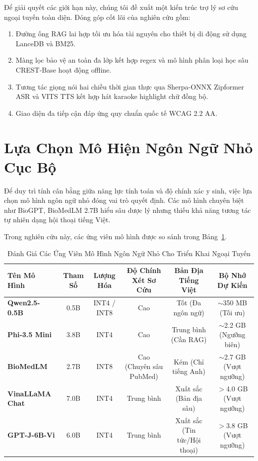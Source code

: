 \documentclass[journal]{IEEEtran}
\begin{document}
Để giải quyết các giới hạn này, chúng tôi đề xuất một kiến trúc trợ lý sơ cứu ngoại tuyến toàn diện. Đóng góp cốt lõi của nghiên cứu gồm:
\begin{enumerate}
\item Đường ống RAG lai hợp tối ưu hóa tài nguyên cho thiết bị di động sử dụng LanceDB và BM25.
\item Màng lọc bảo vệ an toàn đa lớp kết hợp regex và mô hình phân loại học sâu CREST-Base hoạt động offline.
\item Tương tác giọng nói hai chiều thời gian thực qua Sherpa-ONNX Zipformer ASR và VITS TTS kết hợp hát karaoke highlight chữ đồng bộ.
\item Giao diện đa tiếp cận đáp ứng quy chuẩn quốc tế WCAG 2.2 AA.
\end{enumerate}

\section{Lựa Chọn Mô Hiện Ngôn Ngữ Nhỏ Cục Bộ}
Để duy trì tính cân bằng giữa năng lực tính toán và độ chính xác y sinh, việc lựa chọn mô hình ngôn ngữ nhỏ đóng vai trò quyết định. Các mô hình chuyên biệt như BioGPT, BioMedLM 2.7B hiểu sâu dược lý nhưng thiếu khả năng tương tác tự nhiên dạng hội thoại tiếng Việt.

Trong nghiên cứu này, các ứng viên mô hình được so sánh trong Bảng~\ref{tab:models}.

\begin{table}[t]
\centering
\caption{Đánh Giá Các Ứng Viên Mô Hình Ngôn Ngữ Nhỏ Cho Triển Khai Ngoại Tuyến}
\label{tab:models}
\begin{tabular}{lccccc}
\toprule
\textbf{Tên Mô Hình} & \textbf{Tham Số} & \textbf{Lượng Hóa} & \textbf{Độ Chính Xét Sơ Cứu} & \textbf{Bản Địa Tiếng Việt} & \textbf{Bộ Nhớ Dự Kiến} \\
\midrule
\textbf{Qwen2.5-0.5B} & 0.5B & INT4 / INT8 & Cao & Tốt (Đa ngôn ngữ) & $\sim$350 MB (Tối ưu) \\
\textbf{Phi-3.5 Mini} & 3.8B & INT4 & Cao & Trung bình (Cần RAG) & $\sim$2.2 GB (Ngưỡng biên) \\
\textbf{BioMedLM} & 2.7B & INT8 & Cao (Chuyên sâu PubMed) & Kém (Chỉ tiếng Anh) & $\sim$2.7 GB (Vượt ngưỡng) \\
\textbf{VinaLLaMA Chat} & 7.0B & INT4 & Trung bình & Xuất sắc (Bản địa sâu) & $>$4.0 GB (Vượt ngưỡng) \\
\textbf{GPT-J-6B-Vi} & 6.0B & INT4 & Trung bình & Xuất sắc (Tin tức/Hội thoại) & $>$3.8 GB (Vượt ngưỡng) \\
\bottomrule
\end{tabular}
\end{table}
\end{document}
